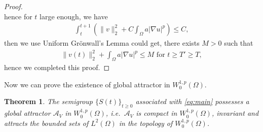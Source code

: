 \documentclass[11pt]{amsart}
\newtheorem{theorem}{Theorem}[section]
\theoremstyle{definition}
\numberwithin{equation}{section}
\newcommand*\abs[1]{\lvert#1\rvert}
\newcommand*\norm[1]{\lVert#1\rVert}
\newcommand*\Brace[1]{\lbrace#1\rbrace}
\begin{document}
\begin{proof}
\begin{equation}
	\end{equation}
	hence for $t$ large enough, we have
	\begin{equation}
		\begin{split}
			\int_t^{t+1}\left(
			\norm{v}_2^2 + C\int_{\Omega}a\abs{\nabla u}^p
			\right) \leq C,
		\end{split}
	\end{equation}
	then we use Uniform Gr\"onwall's Lemma could get, there exists $M > 0$ such that
	\begin{equation}
		\begin{split}
			\norm{v(t)}_2^2
			+ \int_{\Omega}a\abs{\nabla u}^p \leq M \text{ for } t \geq T' \geq T,
		\end{split}
	\end{equation}
	hence we completed this proof.
\end{proof}
Now we can prove the existence of global attractor in
$W_0^{1,p}(\Omega)$.
\begin{theorem}
	The semigroup $\Brace{S(t)}_{t \geq 0}$ associated with \cref{eq:main} possesses
	a global attractor $\mathcal{A}_V$ in $W_0^{1,p}(\Omega)$, i.e.\
	$\mathcal{A}_V$ is compact in $W_0^{1,p}(\Omega)$, invariant and attracts the
	bounded sets of $L^2(\Omega)$ in the topology of $W_0^{1,p}(\Omega)$.
\end{theorem}
\end{document}
